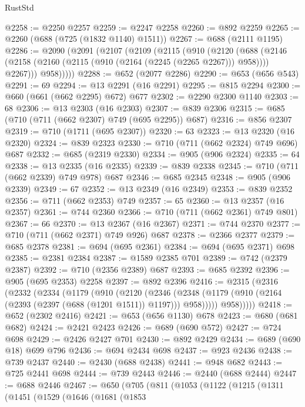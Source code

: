 \begin{lexlean}{RustStd}
\begin{coremodule}
{\begin{coremodule}
{{{{{{{{{{{{{{{{{{{{@2258 := @2250 @2257
@2259 := @2247 @2258
@2260 := @892 @2259
@2265 := @2260 (@688 (@725 (@1832 @1140) @1511))
@2267 := @688 (@2111 @1195)
@2286 := @2090
    (@2091
      (@2107
        (@2109
          (@2115
            (@910
              (@2120
                (@688
                  (@2146 (@2158 (@2160 (@2115 (@910 (@2164 (@2245 (@2265 @2267))) @958)))) @2267)))
              @958)))))
@2288 := @652 (@2077 @2286)
@2290 := @653 (@656 @543)
@2291 := 69
@2294 := @13 @2291 (@16 @2291)
@2295 := @815 @2294
@2300 := @660 (@661 (@662 @2295) @672) @677
@2302 := @2290 @2300 @1140
@2303 := 68
@2306 := @13 @2303 (@16 @2303)
@2307 := @839 @2306
@2315 := @685 (@710 (@711 (@662 @2307) @749 (@695 @2295)) @687)
@2316 := @856 @2307
@2319 := @710 (@1711 (@695 @2307))
@2320 := 63
@2323 := @13 @2320 (@16 @2320)
@2324 := @839 @2323
@2330 := @710 (@711 (@662 @2324) @749 @696) @687
@2332 := @685 (@2319 @2330)
@2334 := @905 (@906 @2324)
@2335 := 64
@2338 := @13 @2335 (@16 @2335)
@2339 := @839 @2338
@2345 := @710 (@711 (@662 @2339) @749 @978) @687
@2346 := @685 @2345
@2348 := @905 (@906 @2339)
@2349 := 67
@2352 := @13 @2349 (@16 @2349)
@2353 := @839 @2352
@2356 := @711 (@662 @2353) @749
@2357 := 65
@2360 := @13 @2357 (@16 @2357)
@2361 := @744 @2360
@2366 := @710 (@711 (@662 @2361) @749 @801)
@2367 := 66
@2370 := @13 @2367 (@16 @2367)
@2371 := @744 @2370
@2377 := @710 (@711 (@662 @2371) @749 @926) @687
@2378 := @2366 @2377
@2379 := @685 @2378
@2381 := @694 (@695 @2361)
@2384 := @694 (@695 @2371) @698
@2385 := @2381 @2384
@2387 := @1589 @2385 @701
@2389 := @742 (@2379 @2387)
@2392 := @710 (@2356 @2389) @687
@2393 := @685 @2392
@2396 := @905 (@695 @2353) @2258
@2397 := @892 @2396
@2416 := @2315
    (@2316
      (@2332
        (@2334
          (@1179
            (@910
              (@2120
                (@2346
                  (@2348 (@1179 (@910 (@2164 (@2393 (@2397 (@688 (@1201 @1511)) @1197))) @958)))))
              @958)))))
@2418 := @652 (@2302 @2416)
@2421 := @653 (@656 @1130) @678
@2423 := @680 (@681 @682)
@2424 := @2421 @2423
@2426 := @689 (@690 @572)
@2427 := @724 @698
@2429 := @2426 @2427 @701
@2430 := @892 @2429
@2434 := @689 (@690 @18) @699 @796
@2436 := @694 @2434 @698
@2437 := @923 @2436
@2438 := @739 @2437
@2440 := @2430 (@688 @2438)
@2441 := @948 @682
@2443 := @725 @2441 @698
@2444 := @739 @2443
@2446 := @2440 (@688 @2444)
@2447 := @688 @2446
@2467 := @650
    (@705
      (@811
        (@1053
          (@1122
            (@1215
              (@1311
                (@1451
                  (@1529
                    (@1646
                      (@1681
                        (@1853
}}}}}}}}}}}}}}}}}}}}
\end{coremodule}}
\end{coremodule}
\end{lexlean}
